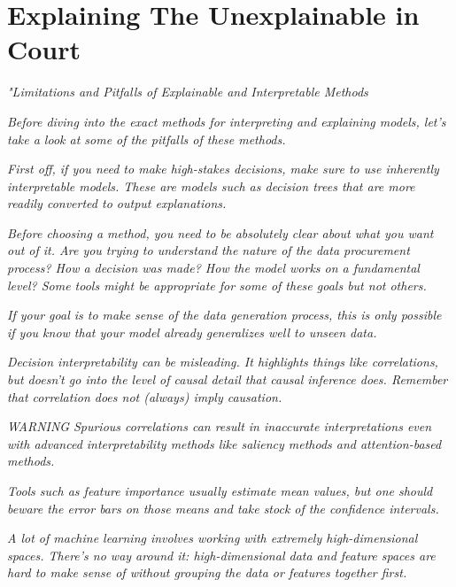 
\section{Explaining The Unexplainable in Court}

\textit{"Limitations and Pitfalls of Explainable and Interpretable Methods}

\textit{Before diving into the exact methods for interpreting and explaining models, let's take a look at some of the pitfalls of these methods.}

\textit{First off, if you need to make high-stakes decisions, make sure to use inherently interpretable models. These are models such as decision trees that are more readily converted to output explanations.}

\textit{Before choosing a method, you need to be absolutely clear about what you want out of it. Are you trying to understand the nature of the data procurement process? How a decision was made? How the model works on a fundamental level? Some tools might be appropriate for some of these goals but not others.}

\textit{If your goal is to make sense of the data generation process, this is only possible if you know that your model already generalizes well to unseen data.}

\textit{Decision interpretability can be misleading. It highlights things like correlations, but doesn’t go into the level of causal detail that causal inference does. Remember that correlation does not (always) imply causation.}

\textit{WARNING}
\textit{Spurious correlations can result in inaccurate interpretations even with advanced interpretability methods like saliency methods and attention-based methods.}

\textit{Tools such as feature importance usually estimate mean values, but one should beware the error bars on those means and take stock of the confidence intervals.}

\textit{A lot of machine learning involves working with extremely high-dimensional spaces. There's no way around it: high-dimensional data and feature spaces are hard to make sense of without grouping the data or features together first.}


